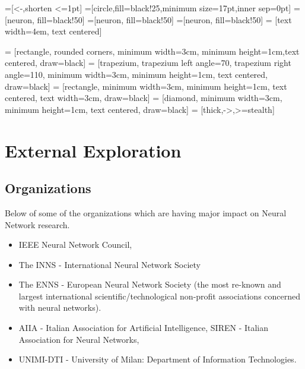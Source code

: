 \documentclass[12pt, right open]{memoir}
\begin{document}

=[<-,shorten <=1pt]
=[circle,fill=black!25,minimum size=17pt,inner sep=0pt]
=[neuron, fill=black!50]
=[neuron, fill=black!50]
=[neuron, fill=black!50]
 = [text width=4em, text centered]

 = [rectangle, rounded corners, minimum width=3cm, minimum height=1cm,text centered, draw=black]
 = [trapezium, trapezium left angle=70, trapezium right angle=110, minimum width=3cm, minimum height=1cm, text centered, draw=black]
 = [rectangle, minimum width=3cm, minimum height=1cm, text centered, text width=3cm, draw=black]
 = [diamond, minimum width=3cm, minimum height=1cm, text centered, draw=black]
 = [thick,->,>=stealth]

\chapter{External Exploration}


\section{Organizations}
Below of some of the organizations which are having major impact on Neural Network research.

\begin{itemize}
\item IEEE Neural Network Council, 
\item The INNS - International Neural Network Society
\item The ENNS - European Neural Network Society
(the most re-known and largest international scientific/technological non-profit associations
concerned with neural networks).
\item AIIA - Italian Association for Artificial Intelligence, SIREN - Italian Association for Neural Networks,
\item UNIMI-DTI - University of Milan: Department of Information Technologies.
\end{itemize}
\end{document}
